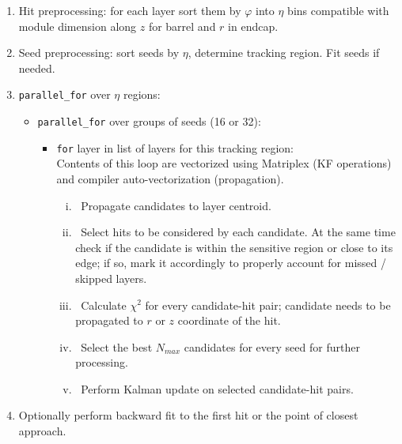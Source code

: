 \documentclass{webofc}
\def\stt#1{{\small\texttt{#1}}}
\begin{document}
\begin{enumerate}

\item Hit preprocessing: for each layer sort them by $\varphi$ into $\eta$ bins
  compatible with module dimension along $z$ for barrel and $r$ in endcap.

\item Seed preprocessing: sort seeds by $\eta$, determine tracking region. Fit
  seeds if needed.

\item \stt{parallel\_for} over $\eta$ regions:

  \begin{itemize}

  \item \stt{parallel\_for} over groups of seeds (16 or 32):
    
    \begin{itemize}

    \item \stt{for} layer in list of layers for this tracking
      region:\\ Contents of this loop are vectorized using Matriplex (KF
      operations) and compiler auto-vectorization (propagation).

          \begin{enumerate}[i.]

          \item\ Propagate candidates to layer centroid.

          \item\ Select hits to be considered by each candidate. At the same
            time check if the candidate is within the sensitive region or
            close to its edge; if so, mark it accordingly to properly account
            for missed / skipped layers.

          \item\ Calculate $\chi^2$ for every candidate-hit pair; candidate
            needs to be propagated to $r$ or $z$ coordinate of the hit.

          \item\ Select the best $N_{max}$ candidates for every seed for
            further processing.

            \item\ Perform Kalman update on selected candidate-hit pairs.

          \end{enumerate}

    \end{itemize}

  \end{itemize}

  \item Optionally perform backward fit to the first hit or the point of
    closest approach.

\end{enumerate}
\end{document}
